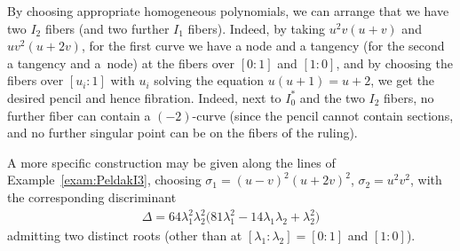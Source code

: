 \documentclass[pdftex]{sigma}
\numberwithin{equation}{section}
\begin{document}
\begin{Example} By choosing appropriate homogeneous polynomials, we can arrange that we have two $I_2$ fibers (and two further $I_1$ fibers). Indeed, by taking $u^2v(u+v)$ and $uv^2(u+2v)$, for the first curve we have a node and a tangency (for the second a tangency and a~node) at the fibers over $[0:1]$ and $[1:0]$, and by choosing the fibers over $[u_i:1]$ with $u_i$ solving the equation $u(u+1)=u+2$, we get the desired pencil and hence fibration. Indeed, next to $I_0^*$ and the two $I_2$ fibers, no further fiber can contain a $(-2)$-curve (since the pencil cannot contain sections, and no further singular point can be on the fibers of the ruling).

A more specific construction may be given along the lines of Example~\ref{exam:PeldakI3},
choosing $\sigma_1 = (u-v)^2 (u+2v)^2$, $\sigma_2 = u^2v^2$, with the corresponding discriminant
\begin{gather*}
 \Delta = 64 \lambda_1^2 \lambda_2^2 \big(81 \lambda_1^2 -14 \lambda_1 \lambda_2 + \lambda_2^2\big)
\end{gather*}
admitting two distinct roots (other than at $[\lambda_1 : \lambda_2] = [0:1]$ and $[1:0]$).
\end{Example}
\end{document}
